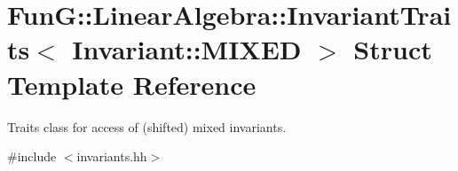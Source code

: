 \hypertarget{structFunG_1_1LinearAlgebra_1_1InvariantTraits_3_01Invariant_1_1MIXED_01_4}{\section{Fun\-G\-:\-:Linear\-Algebra\-:\-:Invariant\-Traits$<$ Invariant\-:\-:M\-I\-X\-E\-D $>$ Struct Template Reference}
\label{structFunG_1_1LinearAlgebra_1_1InvariantTraits_3_01Invariant_1_1MIXED_01_4}
}


Traits class for access of (shifted) mixed invariants.  




{\ttfamily \#include $<$invariants.\-hh$>$}

